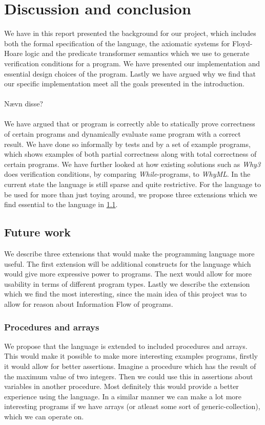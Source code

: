 \section{Discussion and conclusion}\label{sec:conclusion}
We have in this report presented the background for our project, which includes both the formal specification of the language, the axiomatic systems for Floyd-Hoare logic and the predicate transformer semantics which we use to generate verification conditions for a program.
We have presented our implementation and essential design choices of the program.
Lastly we have argued why we find that our specific implementation meet all the goals presented in the introduction.
\\~\\
Nævn disse?
\\~\\
We have argued that or program is correctly able to statically prove correctness of certain programs and dynamically evaluate same program with a correct result. We have done so informally by tests and by a set of example programs, which shows examples of both partial correctness along with total correctness of certain programs.
We have further looked at how existing solutions such as \textit{Why3} does verification conditions, by comparing \textit{While}-programs, to \textit{WhyML}.
In the current state the language is still sparse and quite restrictive. For the language to be used for more than just toying around, we propose three extensions which we find essential to the language in \cref{sec:future}.

\subsection{Future work}\label{sec:future}
We describe three extensions that would make the programming language more useful. The first extension will be additional constructs for the language which would give more expressive power to programs. The next would allow for more usability in terms of different program types. Lastly we describe the extension which we find the most interesting, since the main idea of this project was to allow for reason about Information Flow of programs.

\subsubsection{Procedures and arrays}
We propose that the language is extended to included procedures and arrays. This would make it possible to make more interesting examples programs, firstly it would allow for better assertions. Imagine a procedure which has the result of the maximum value of two integers. Then we could use this in assertions about variables in another procedure. Most definitely this would provide a better experience using the language. In a similar manner we can make a lot more interesting programs if we have arrays (or atleast some sort of generic-collection), which we can operate on.

